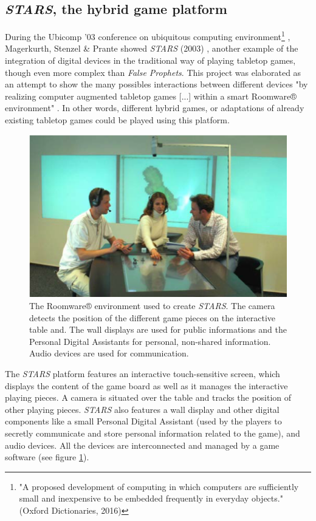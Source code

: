 \subsection{\textit{STARS}, the hybrid game platform}
During the Ubicomp '03 conference on ubiquitous computing environment\footnote{"A proposed development of computing in which computers are sufficiently small and inexpensive to be embedded frequently in everyday objects."(Oxford Dictionaries, 2016)}
, Magerkurth, Stenzel \& Prante showed \textit{STARS} (2003) \cite{art:stars}, another example of the integration of digital devices in the traditional way of playing tabletop games, though even more complex than \textit{False Prophets}. This project was elaborated as an attempt to show the many possibles interactions between different devices "by realizing computer augmented tabletop games [...] within a smart Roomware® environment" \cite{art:stars}. In other words, different hybrid games, or adaptations of already existing tabletop games could be played using this platform.

\begin{figure}[!ht]
    \centering
    \includegraphics[scale=0.4]{Images/roomware.png}
    \caption{The Roomware® environment used to create \textit{STARS}. The camera detects the position of the different game pieces on the interactive table and. The wall displays are used for public informations and the Personal Digital Assistants for personal, non-shared information. Audio devices are used for communication.}
    \label{fig:roomware}
\end{figure}

The \textit{STARS} platform features an interactive touch-sensitive screen, which displays the content of the game board as well as it manages the interactive playing pieces. A camera is situated over the table and tracks the position of other playing pieces. \textit{STARS} also features a wall display and other digital components like a small Personal Digital Assistant (used by the players to secretly communicate and store personal information related to the game), and audio devices. All the devices are interconnected and managed by a game software (see figure \ref{fig:roomware}). 

